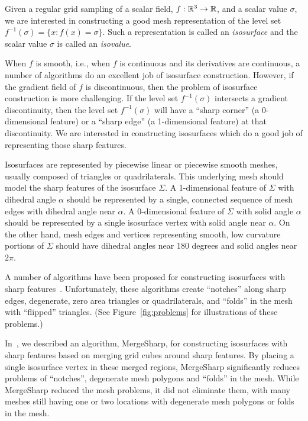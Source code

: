 

\maketitle

Given a regular grid sampling of a scalar field, $f: \mathbb{R}^{3} \rightarrow \mathbb{R}$,
and a scalar value $\sigma$,
we are interested in constructing a good mesh representation
of the level set $f^{-1}(\sigma) = \{x : f(x) = \sigma \}$.
Such a representation is called an {\em isosurface} 
and the scalar value $\sigma$ is called an {\em isovalue}.

When $f$ is smooth,
i.e., when $f$ is continuous and its derivatives are continuous,
a number of algorithms do an excellent job of isosurface construction.
However, if the gradient field of $f$ is discontinuous,
then the problem of isosurface construction is more challenging.
If the level set $f^{-1}(\sigma)$ intersects a gradient discontinuity,
then the level set $f^{-1}(\sigma)$ will have a ``sharp corner''
(a 0-dimensional feature) or a ``sharp edge'' (a 1-dimensional feature)
at that discontinuity.
We are interested in constructing isosurfaces
which do a good job of representing those sharp features.

Isosurfaces are represented by piecewise linear or piecewise smooth meshes,
usually composed of triangles or quadrilaterals.
This underlying mesh should model the sharp features
of the isosurface $\Sigma$.
A 1-dimensional feature of $\Sigma$ with dihedral angle $\alpha$
should be represented by a single, 
connected sequence of mesh edges with dihedral angle near $\alpha$.
A 0-dimensional feature of $\Sigma$ with solid angle $\alpha$
should be represented by a single
isosurface vertex with solid angle near $\alpha$.
On the other hand, mesh edges and vertices
representing smooth, low curvature portions of $\Sigma$ should have
dihedral angles near 180 degrees and solid angles near $2 \pi$.

A number of algorithms have been proposed
for constructing isosurfaces 
with sharp features~\cite{ab-fpmmo-03,gk-eretm-04,hwco-cmsaf-05,
jlsw-dchd-02,kbsh-fssev-01,ms-ispmg-10,Varadhan:2003:fss,
sw-dmcpc-04,zhk-dctps-04}.
Unfortunately, these algorithms create ``notches'' along sharp edges,
degenerate, zero area triangles or quadrilaterals,
and ``folds'' in the mesh with ``flipped'' triangles.
(See Figure~\ref{fig:problems}
for illustrations of these problems.)

In~\cite{bw-cisec-13},
we described an algorithm, MergeSharp,
for constructing isosurfaces with sharp features
based on merging grid cubes around sharp features.
By placing a single isosurface vertex in these merged regions,
MergeSharp significantly reduces problems of ``notches'',
degenerate mesh polygons and ``folds'' in the mesh.
While MergeSharp reduced the mesh problems,
it did not eliminate them, 
with many meshes still having
one or two locations with degenerate mesh polygons or folds in the mesh.

